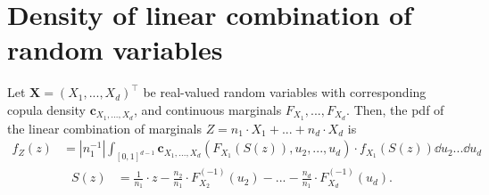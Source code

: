 \newpage
\appendix
\section{Density of linear combination of random variables}
\label{sec:appendix}
\begin{proposition}
   Let $\bm{X} = (X_1, ..., X_d)^\top$ be real-valued random variables with corresponding
   copula density $\bm{c}_{X_1, ..., X_d}$, and continuous marginals $F_{X_1}, ..., F_{X_d}$.
   Then, the
   pdf of the linear combination of marginals $Z = n_1 \cdot X_1 +
   ... +  n_d \cdot X_d $ is
   \begin{align}
   f_Z(z) &= \left| n_1^{-1} \right| \int_{[0,1]^{d-1}} \bm{c}_{X_1,...,X_d}
      \left(F_{X_1} (S(z)), u_2, ..., u_d \right) \cdot
      f_{X_1} (S(z)) \dd u_2 ... \dd u_d \label{density}
   \end{align}
   \begin{align*}
      S(z) &= \frac{1}{n_1}\cdot z - \frac{n_2}{n_1} \cdot F^{(-1)}_{X_2}(u_2) - ... -  \frac{n_d}{n_1} \cdot F^{(-1)}_{X_d}(u_d).
      \end{align*}
   \end{proposition}

